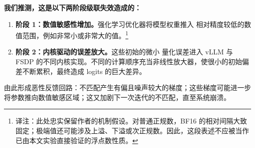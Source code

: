 
\textbf{我们推测，这是以下两阶段级联失效造成的：}



\begin{enumerate}

\item \textbf{阶段 1：数值敏感性增加。}强化学习优化器将模型权重推入  相对精度较低的数值范围，例如非常小或非常大的值。\footnote{译注：此处忠实保留作者的机制假设。对普通正规数，BF16 的相对间隔大致固定；极端值还可能涉及上溢、下溢或次正规数。因此，这段表述不应被当作已由本文实验直接验证的浮点数性质。}


\item \textbf{阶段 2：内核驱动的误差放大。}这些初始的微小  量化误差进入 vLLM 与 FSDP 的不同内核实现。不同的计算顺序充当非线性放大器，使很小的初始偏差不断累积，最终造成 logits 的巨大差异。

\end{enumerate}


由此形成恶性反馈回路：不匹配产生有偏且噪声较大的梯度；这些梯度可能进一步将参数推向数值敏感区域；这又加剧下一次迭代的不匹配，直至系统崩溃。


